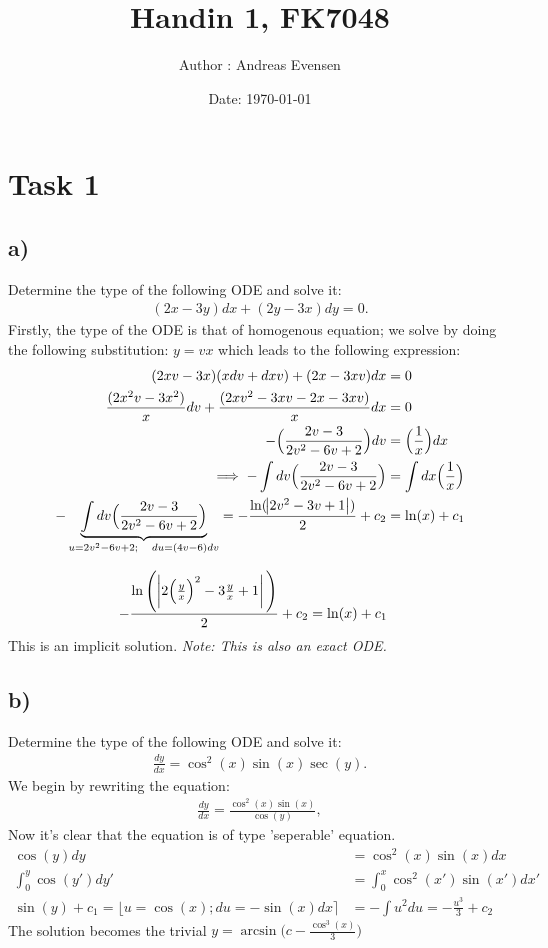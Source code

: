 \documentclass{article}
\title{Handin 1, FK7048}
\author{Author : Andreas Evensen}
\date{Date: \today}
\begin{document}
\maketitle

\section*{Task 1}
\subsection*{a)}
Determine the type of the following ODE and solve it:
\begin{align*}
    (2x-3y)dx + (2y - 3x)dy = 0.
\end{align*}
Firstly, the type of the ODE is that of homogenous equation; we solve by doing the following substitution: $y=vx$ which leads to the following expression:
\begin{align*}
    (2xv - 3x)(xdv + dx v) + (2x - 3xv)dx &= 0\\
    \frac{(2x^2 v - 3x^2)}{x}dv + \frac{(2xv^2 - 3xv - 2x - 3xv)}{x}dx&=0\\
    - \Big(\frac{2v - 3}{2v^2 - 6v + 2}\Big)dv &= \Big(\frac{1}{x}\Big)dx\\
    \implies-\int dv\Big(\frac{2v-3}{2v^2-6v+2}\Big)&=\int dx\Big(\frac{1}{x}\Big)\\
    -\underbrace{\int dv\Big(\frac{2v-3}{2v^2-6v+2}\Big)}_{u = 2v^2 - 6v + 2;\quad du = (4v - 6) dv}=-\frac{\ln(\abs{2v^2 - 3v + 1})}{2} + c_2&= \ln(x) + c_1
\end{align*}

\begin{align*}
    -\frac{\ln\Bigg(\abs{2\Big(\frac{y}{x}\Big)^2 - 3\frac{y}{x} + 1}\Bigg)}{2} + c_2&= \ln(x) + c_1    
\end{align*}
This is an implicit solution. \textit{Note: This is also an exact ODE.}

\subsection*{b)}
Determine the type of the following ODE and solve it:
\begin{align*}
    \frac{dy}{dx} = \cos^2(x)\sin(x)\sec(y).
\end{align*}
We begin by rewriting the equation:
\begin{align*}
    \frac{dy}{dx} = \frac{\cos^2(x)\sin(x)}{\cos(y)},
\end{align*}Now it's clear that the equation is of type 'seperable' equation.
\begin{align*}
    \cos(y)dy &=\cos^2(x)\sin(x)dx\\
    \int_{0}^{y}\cos(y')dy' &=\int_{0}^{x}\cos^2(x')\sin(x')dx'\\
    \sin(y) + c_1 = \lfloor u = \cos(x); du = -\sin(x)dx \rceil&=-\int u^2 du = -\frac{u^3}{3} + c_2
\end{align*}
The solution becomes the trivial $y = \arcsin\Big(c-\frac{\cos^3(x)}{3}\Big)$
\end{document}
